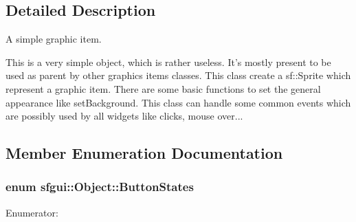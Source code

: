 \subsection{Detailed Description}
A simple graphic item. 

This is a very simple object, which is rather useless. It's mostly present to be used as parent by other graphics items classes. This class create a sf::Sprite which represent a graphic item. There are some basic functions to set the general appearance like setBackground. This class can handle some common events which are possibly used by all widgets like clicks, mouse over... 

\subsection{Member Enumeration Documentation}
\hypertarget{classsfgui_1_1Object_8a7d7ae20a88b7ef8a104f7e6c8596ce}{
\subsubsection[ButtonStates]{\setlength{\rightskip}{0pt plus 5cm}enum {\bf sfgui::Object::ButtonStates}}}
\label{classsfgui_1_1Object_8a7d7ae20a88b7ef8a104f7e6c8596ce}


\begin{Desc}
\item[Enumerator: ]\par
\begin{description}
\item[{\em 
\hypertarget{classsfgui_1_1Object_8a7d7ae20a88b7ef8a104f7e6c8596cee8211d79a1f35d08db2b31a914bddc38}{
BackgroundNormal}
\label{classsfgui_1_1Object_8a7d7ae20a88b7ef8a104f7e6c8596cee8211d79a1f35d08db2b31a914bddc38}
}]\item[{\em 
\hypertarget{classsfgui_1_1Object_8a7d7ae20a88b7ef8a104f7e6c8596ce03b529b6f0fee7ab7cc0033441180b67}{
BackgroundClicked}
\label{classsfgui_1_1Object_8a7d7ae20a88b7ef8a104f7e6c8596ce03b529b6f0fee7ab7cc0033441180b67}
}]\item[{\em 
\hypertarget{classsfgui_1_1Object_8a7d7ae20a88b7ef8a104f7e6c8596ce9befc9dbae9107e3e7546af33a139df9}{
BackgroundHover}
\label{classsfgui_1_1Object_8a7d7ae20a88b7ef8a104f7e6c8596ce9befc9dbae9107e3e7546af33a139df9}
}]\end{description}
\end{Desc}



